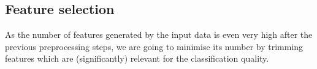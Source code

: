 
\subsection{Feature selection}

As the number of features generated by the input data is even very high after the previous preprocessing steps, we are going to minimise its number by trimming features which are (significantly) relevant for the classification quality.

\todo{\dots}


